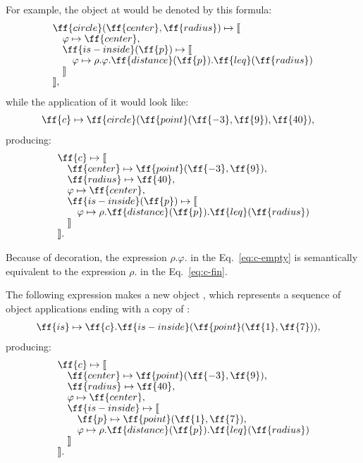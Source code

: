 For example, the object at  would
be denoted by this formula:
\begin{equation}\label{eq:c-empty}
\begin{split}
& \ff{circle}(\ff{center}, \ff{radius}) \mapsto \llbracket \br
& \quad \varphi \mapsto \ff{center}, \br
& \quad \ff{is-inside}(\ff{p}) \mapsto \llbracket \br
& \quad \quad \varphi \mapsto \rho.\varphi.\ff{distance}(\ff{p}).\ff{leq}(\ff{radius}) \br
& \quad \rrbracket \br
& \rrbracket,
\end{split}
\end{equation}
while the application of it would look like:
\begin{equation}
\begin{split}
\ff{c} & \mapsto \ff{circle}(\ff{point}(\ff{-3}, \ff{9}), \ff{40}),
\end{split}
\end{equation}
producing:
\begin{equation}\label{eq:c-fin}
\begin{split}
& \ff{c} \mapsto \llbracket \br
& \quad \ff{center} \mapsto \ff{point}(\ff{-3}, \ff{9}), \br
& \quad \ff{radius} \mapsto \ff{40}, \br
& \quad \varphi \mapsto \ff{center}, \br
& \quad \ff{is-inside}(\ff{p}) \mapsto \llbracket \br
& \quad \quad \varphi \mapsto \rho.\ff{distance}(\ff{p}).\ff{leq}(\ff{radius}) \br
& \quad \rrbracket \br
& \rrbracket.
\end{split}
\end{equation}

Because of decoration, the expression
$\rho$.$\varphi$. in the Eq.~\ref{eq:c-empty} is semantically equivalent to the expression
$\rho$. in the Eq.~\ref{eq:c-fin}.

The following expression makes a new object , which represents
a sequence of object applications ending with a copy of :
\begin{equation}\label{eq:is}
\begin{split}
& \ff{is} \mapsto \ff{c}.\ff{is-inside}(\ff{point}(\ff{1}, \ff{7})),
\end{split}
\end{equation}
producing:
\begin{equation}\label{eq:c-fin2}
\begin{split}
& \ff{c} \mapsto \llbracket \br
& \quad \ff{center} \mapsto \ff{point}(\ff{-3}, \ff{9}), \br
& \quad \ff{radius} \mapsto \ff{40}, \br
& \quad \varphi \mapsto \ff{center}, \br
& \quad \ff{is-inside} \mapsto \llbracket \br
& \quad \quad \ff{p} \mapsto \ff{point}(\ff{1}, \ff{7}), \br
& \quad \quad \varphi \mapsto \rho.\ff{distance}(\ff{p}).\ff{leq}(\ff{radius}) \br
& \quad \rrbracket \br
& \rrbracket.
\end{split}
\end{equation}

